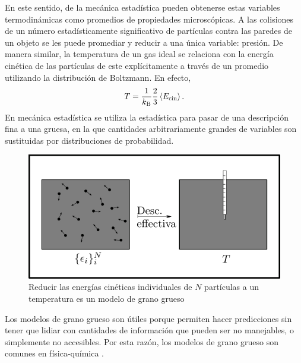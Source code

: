  En este sentido, de la mecánica estadística pueden obtenerse estas variables termodinámicas como promedios de propiedades microscópicas. A las colisiones de un número estadísticamente significativo de partículas contra las paredes de un objeto se les puede promediar y reducir a una única variable: presión. De manera similar, la temperatura de un gas ideal se relaciona con la energía cinética de las partículas de este explícitamente a través de un promedio utilizando la distribución de Boltzmann. En efecto, 
\begin{equation}
    T=\frac{1}{k_\text{B}}\frac{2}{3}\expval{E_{\text{cin}}}.
\end{equation}
En mecánica estadística se utiliza la estadística para pasar de una descripción fina a una gruesa, en la que cantidades arbitrariamente grandes de variables son sustituidas por distribuciones de probabilidad.
\begin{figure}[ht]
    \centering
    \includegraphics[width=0.6\linewidth]{chapter1/figures/CGT.png}
    \caption{Reducir las energías cinéticas individuales de $N$ partículas a un temperatura es un modelo de grano grueso}
    \label{fig:KtoT}
\end{figure}

Los modelos de grano grueso son útiles porque permiten hacer predicciones sin tener que lidiar con cantidades de información que pueden ser no manejables, o simplemente no accesibles. Por esta razón, los modelos de grano grueso son comunes en física-química \cite{PhysChemI,PhysChemII,PhysChemIII} .

 

